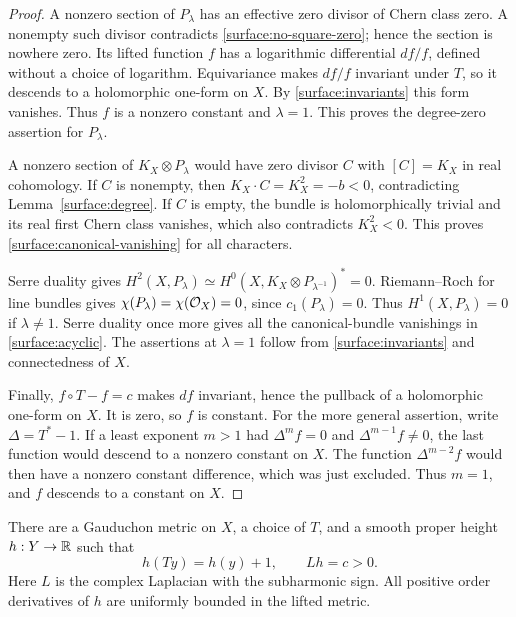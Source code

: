 \begin{proof}
A nonzero section of $P_\lambda$ has an effective zero divisor of Chern
class zero. A nonempty such divisor contradicts
\eqref{surface:no-square-zero}; hence the section is nowhere zero.
Its lifted function $f$ has a logarithmic differential $df/f$, defined
without a choice of logarithm. Equivariance makes $df/f$ invariant under
$T$, so it descends to a holomorphic one-form on $X$. By
\eqref{surface:invariants} this form vanishes. Thus $f$ is a nonzero
constant and $\lambda=1$. This proves the degree-zero assertion for
$P_\lambda$.

A nonzero section of $K_X\otimes P_\lambda$ would have zero divisor $C$
with $[C]=K_X$ in real cohomology. If $C$ is nonempty, then
$K_X\cdot C=K_X^2=-b<0$, contradicting Lemma~\ref{surface:degree}.
If $C$ is empty, the bundle is holomorphically trivial and its real first
Chern class vanishes, which also contradicts $K_X^2<0$. This proves
\eqref{surface:canonical-vanishing} for all characters.

Serre duality gives
$H^2(X,P_\lambda)\simeq
H^0(X,K_X\otimes P_{\lambda^{-1}})^*=0$.
Riemann--Roch for line bundles gives
$\chi(P_\lambda)=\chi(\mathcal O_X)=0$, since $c_1(P_\lambda)=0$.
Thus $H^1(X,P_\lambda)=0$ if $\lambda\neq1$. Serre duality once more
gives all the canonical-bundle vanishings in \eqref{surface:acyclic}.
The assertions at $\lambda=1$ follow from
\eqref{surface:invariants} and connectedness of $X$.

Finally, $f\circ T-f=c$ makes $df$ invariant, hence the pullback of a
holomorphic one-form on $X$. It is zero, so $f$ is constant. For the more
general assertion, write $\Delta=T^*-1$. If a least exponent $m>1$ had
$\Delta^m f=0$ and $\Delta^{m-1}f\neq0$, the last function would descend
to a nonzero constant on $X$. The function $\Delta^{m-2}f$ would then
have a nonzero constant difference, which was just excluded. Thus $m=1$,
and $f$ descends to a constant on $X$.
\end{proof}

\begin{lemma}\label{surface:height}
There are a Gauduchon metric on $X$, a choice of $T$, and a smooth proper
height $h:Y\to\mathbb R$ such that
\begin{equation}\label{surface:positive-height}
 h(Ty)=h(y)+1,\qquad Lh=c>0.
\end{equation}
Here $L$ is the complex Laplacian with the subharmonic sign. All positive
order derivatives of $h$ are uniformly bounded in the lifted metric.
\end{lemma}

